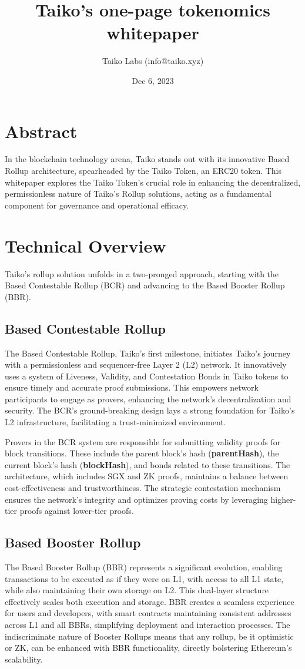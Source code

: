 \documentclass[twocolumn]{article}
\title{\huge Taiko's one-page tokenomics whitepaper}
\date{Dec 6, 2023}
\author{Taiko Labs (info@taiko.xyz)}
\begin{document}
\maketitle

\section*{Abstract}
In the blockchain technology arena, Taiko stands out with its innovative Based Rollup architecture, spearheaded by the Taiko Token, an ERC20 token. This whitepaper explores the Taiko Token's crucial role in enhancing the decentralized, permissionless nature of Taiko's Rollup solutions, acting as a fundamental component for governance and operational efficacy.

\section*{Technical Overview}
Taiko's rollup solution unfolds in a two-pronged approach, starting with the Based Contestable Rollup (BCR) and advancing to the Based Booster Rollup (BBR).

\subsection*{Based Contestable Rollup}
The Based Contestable Rollup, Taiko's first milestone, initiates Taiko's journey with a permissionless and sequencer-free Layer 2 (L2) network. It innovatively uses a system of Liveness, Validity, and Contestation Bonds in Taiko tokens to ensure timely and accurate proof submissions. This empowers network participants to engage as provers, enhancing the network's decentralization and security. The BCR's ground-breaking design lays a strong foundation for Taiko's L2 infrastructure, facilitating a trust-minimized environment.

Provers in the BCR system are responsible for submitting validity proofs for block transitions. These include the parent block's hash (\textbf{parentHash}), the current block's hash (\textbf{blockHash}), and bonds related to these transitions. The architecture, which includes SGX and ZK proofs, maintains a balance between cost-effectiveness and trustworthiness. The strategic contestation mechanism ensures the network's integrity and optimizes proving costs by leveraging higher-tier proofs against lower-tier proofs.

\subsection*{Based Booster Rollup}
The Based Booster Rollup (BBR) represents a significant evolution, enabling transactions to be executed as if they were on L1, with access to all L1 state, while also maintaining their own storage on L2. This dual-layer structure effectively scales both execution and storage. BBR creates a seamless experience for users and developers, with smart contracts maintaining consistent addresses across L1 and all BBRs, simplifying deployment and interaction processes. The indiscriminate nature of Booster Rollups means that any rollup, be it optimistic or ZK, can be enhanced with BBR functionality, directly bolstering Ethereum's scalability.
\end{document}
